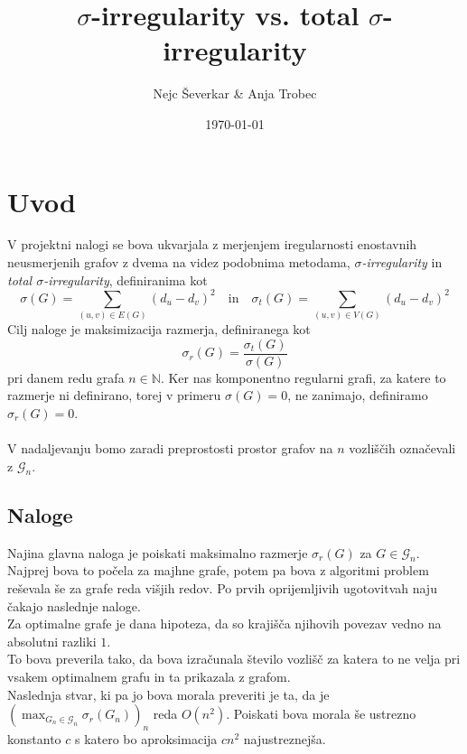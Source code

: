 \documentclass[ letterpaper, titlepage, fleqn]{article}
\begin{document}
\title{$\sigma$-irregularity vs. total $\sigma$-irregularity}
\author{Nejc Ševerkar \& Anja Trobec}
\date{\today}
\maketitle
\pagebreak

\thispagestyle{empty}
\tableofcontents
\pagebreak

\section{Uvod}

V projektni nalogi se bova ukvarjala z merjenjem iregularnosti enostavnih neusmerjenih grafov z
dvema na videz podobnima metodama, {\em $\sigma$-irregularity} in {\em total $\sigma$-irregularity},
definiranima kot 
$$
\sigma(G) = \sum_{(u, v) \in E(G)}(d_u - d_v)^2 
\quad \text{in} \quad
\sigma_t(G) = \sum_{(u, v) \in V(G)}(d_u - d_v)^2
$$
Cilj naloge je maksimizacija razmerja, definiranega kot 
$$\sigma_r(G) = \frac{\sigma_t(G)}{\sigma(G)}$$
pri danem redu grafa $n \in \mathbb{N}$.
Ker nas komponentno regularni grafi, za katere to razmerje ni definirano,
torej v primeru $\sigma(G) = 0$, ne zanimajo, definiramo $\sigma_r(G) = 0$.
\\\\
V nadaljevanju bomo zaradi preprostosti prostor grafov na $n$ vozliščih označevali z $\mathscr{G}_n$.

\subsection{Naloge}

Najina glavna naloga je poiskati maksimalno razmerje $\sigma_r(G)$ za $G \in \mathscr{G}_n$.
Najprej bova to počela za majhne grafe, potem pa bova z algoritmi problem reševala še za grafe reda višjih redov. 
Po prvih oprijemljivih ugotovitvah naju čakajo naslednje naloge. \\

Za optimalne grafe je dana hipoteza, da so krajišča njihovih povezav vedno na absolutni razliki $1$. \\
To bova preverila tako, da bova izračunala število vozlišč za katera
to ne velja pri vsakem optimalnem grafu in ta prikazala z grafom. \\

Naslednja stvar, ki pa jo bova morala preveriti je ta, da je $(\max_{G_n \in \mathscr{G}_n} \sigma_r(G_n))_n$ 
reda $O(n^2)$. 
Poiskati bova morala še ustrezno konstanto $c$ s katero bo aproksimacija $cn^2$ najustreznejša.
\end{document}
